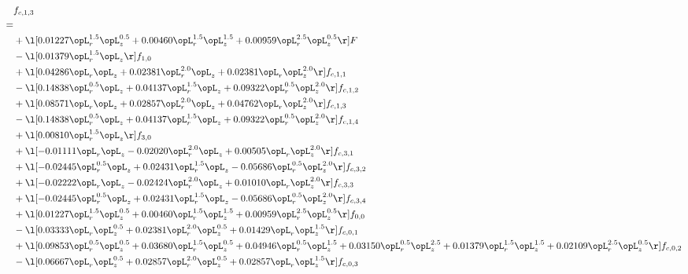 \begin{alignat}{2} 
\label{eq:f_13_1} 
& f_{c,1,3} \nonumber \\ 
 = \\ 
& + \l[  0.01227 \opL_r^{1.5} \opL_z^{0.5} +  0.00460 \opL_r^{1.5} \opL_z^{1.5} +  0.00959 \opL_r^{2.5} \opL_z^{0.5}  \r] F \nonumber \\ 
& - \l[  0.01379 \opL_r^{1.5} \opL_z  \r] f_{1,0} \nonumber \\ 
& + \l[  0.04286 \opL_r \opL_z +  0.02381 \opL_r^{2.0} \opL_z +  0.02381 \opL_r \opL_z^{2.0}  \r] f_{c,1,1} \nonumber \\ 
& - \l[  0.14838 \opL_r^{0.5} \opL_z +  0.04137 \opL_r^{1.5} \opL_z +  0.09322 \opL_r^{0.5} \opL_z^{2.0}  \r] f_{c,1,2} \nonumber \\ 
& + \l[  0.08571 \opL_r \opL_z +  0.02857 \opL_r^{2.0} \opL_z +  0.04762 \opL_r \opL_z^{2.0}  \r] f_{c,1,3} \nonumber \\ 
& - \l[  0.14838 \opL_r^{0.5} \opL_z +  0.04137 \opL_r^{1.5} \opL_z +  0.09322 \opL_r^{0.5} \opL_z^{2.0}  \r] f_{c,1,4} \nonumber \\ 
& + \l[  0.00810 \opL_r^{1.5} \opL_z  \r] f_{3,0} \nonumber \\ 
& + \l[  -0.01111 \opL_r \opL_z   -0.02020 \opL_r^{2.0} \opL_z +  0.00505 \opL_r \opL_z^{2.0}  \r] f_{c,3,1} \nonumber \\ 
& + \l[  -0.02445 \opL_r^{0.5} \opL_z +  0.02431 \opL_r^{1.5} \opL_z   -0.05686 \opL_r^{0.5} \opL_z^{2.0}  \r] f_{c,3,2} \nonumber \\ 
& + \l[  -0.02222 \opL_r \opL_z   -0.02424 \opL_r^{2.0} \opL_z +  0.01010 \opL_r \opL_z^{2.0}  \r] f_{c,3,3} \nonumber \\ 
& + \l[  -0.02445 \opL_r^{0.5} \opL_z +  0.02431 \opL_r^{1.5} \opL_z   -0.05686 \opL_r^{0.5} \opL_z^{2.0}  \r] f_{c,3,4} \nonumber \\ 
& + \l[  0.01227 \opL_r^{1.5} \opL_z^{0.5} +  0.00460 \opL_r^{1.5} \opL_z^{1.5} +  0.00959 \opL_r^{2.5} \opL_z^{0.5}  \r] f_{0,0} \nonumber \\ 
& - \l[  0.03333 \opL_r \opL_z^{0.5} +  0.02381 \opL_r^{2.0} \opL_z^{0.5} +  0.01429 \opL_r \opL_z^{1.5}  \r] f_{c,0,1} \nonumber \\ 
& + \l[  0.09853 \opL_r^{0.5} \opL_z^{0.5} +  0.03680 \opL_r^{1.5} \opL_z^{0.5} +  0.04946 \opL_r^{0.5} \opL_z^{1.5} +  0.03150 \opL_r^{0.5} \opL_z^{2.5} +  0.01379 \opL_r^{1.5} \opL_z^{1.5} +  0.02109 \opL_r^{2.5} \opL_z^{0.5}  \r] f_{c,0,2} \nonumber \\ 
& - \l[  0.06667 \opL_r \opL_z^{0.5} +  0.02857 \opL_r^{2.0} \opL_z^{0.5} +  0.02857 \opL_r \opL_z^{1.5}  \r] f_{c,0,3} \nonumber \\ 

\end{alignat}
